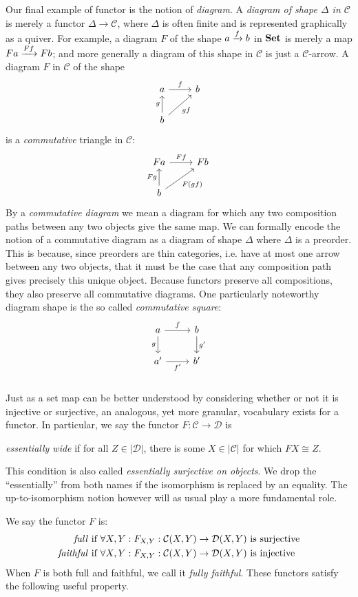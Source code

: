 Our final example of functor is the notion of \emph{diagram}. A \emph{diagram of shape $\Delta$ in $\mathcal{C}$} is merely a functor $\Delta\to\mathcal{C}$, where $\Delta$ is often finite and is represented graphically as a quiver. For example, a diagram $F$ of the shape $a\xrightarrow{f} b$ in $\mathbf{Set}$ is merely a map $Fa\xrightarrow{Ff}Fb$; and more generally a diagram of this shape in $\mathcal{C}$ is just a $\mathcal{C}$-arrow. A diagram $F$ in $\mathcal{C}$ of the shape
\[\begin{tikzcd}
a \arrow[r,"f"] & b \\
b \arrow[u,"g"] \arrow[ur,"gf"']
\end{tikzcd}\]
is a \emph{commutative} triangle in $\mathcal{C}$:
\[\begin{tikzcd}
Fa \arrow[r,"Ff"] & Fb \\
b \arrow[u,"Fg"] \arrow[ur,"F(gf)"']
\end{tikzcd}\]
By a \emph{commutative diagram} we mean a diagram for which any two composition paths between any two objects give the same map. We can formally encode the notion of a commutative diagram as a diagram of shape $\Delta$ where $\Delta$ is a preorder. This is because, since preorders are thin categories, i.e. have at most one arrow between any two objects, that it must be the case that any composition path gives precisely this unique object. Because functors preserve all compositions, they also preserve all commutative diagrams. One particularly noteworthy diagram shape is the so called \emph{commutative square}:
\[\begin{tikzcd}
a \arrow[r,"f"] \arrow[d,"g"'] & b \arrow[d,"g'"] \\
a'  \arrow[r,"f'"']  & b' \\ 
\end{tikzcd}\]
Just as a set map can be better understood by considering whether or not it is injective or surjective, an analogous, yet more granular, vocabulary exists for a functor. In particular, we say the functor $F:\mathcal{C}\to\mathcal{D}$ is
\begin{center} \emph{essentially wide} if for all $Z\in|\mathcal{D}|$, there is some $X\in|\mathcal{C}|$ for which $FX\cong Z$.
\end{center}
This condition is also called \emph{essentially surjective on objects}. We drop the ``essentially'' from both names if the isomorphism is replaced by an equality. The up-to-isomorphism notion however will as usual play a more fundamental role.

We say the functor $F$ is:
\begin{align*}
    \text{\emph{full} if } & \forall X,Y: F_{X,Y}:\mathcal{C}(X,Y)\to\mathcal{D}(X,Y)\text{ is surjective}
    \\
    \text{\emph{faithful} if } & \forall X,Y: F_{X,Y}:\mathcal{C}(X,Y)\to\mathcal{D}(X,Y)\text{ is injective}
\end{align*}
When $F$ is both full and faithful, we call it \emph{fully faithful}. These functors satisfy the following useful property.

